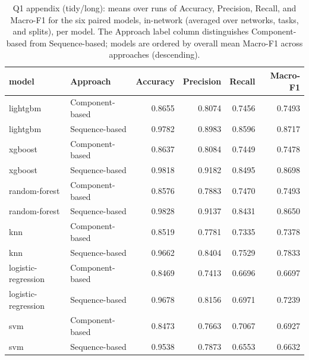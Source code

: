 \begin{table}
\caption{Q1 appendix (tidy/long): means over runs of Accuracy, Precision, Recall, and Macro-F1 for the six paired models, in-network (averaged over networks, tasks, and splits), per model. The Approach label column distinguishes Component-based from Sequence-based; models are ordered by overall mean Macro-F1 across approaches (descending).}
\label{tab:q1_appendix_per_model}
\begin{tabular}{llrrrr}
\toprule
model & Approach & Accuracy & Precision & Recall & Macro-F1 \\
\midrule
lightgbm & Component-based & 0.8655 & 0.8074 & 0.7456 & 0.7493 \\
lightgbm & Sequence-based & 0.9782 & 0.8983 & 0.8596 & 0.8717 \\
xgboost & Component-based & 0.8637 & 0.8084 & 0.7449 & 0.7478 \\
xgboost & Sequence-based & 0.9818 & 0.9182 & 0.8495 & 0.8698 \\
random-forest & Component-based & 0.8576 & 0.7883 & 0.7470 & 0.7493 \\
random-forest & Sequence-based & 0.9828 & 0.9137 & 0.8431 & 0.8650 \\
knn & Component-based & 0.8519 & 0.7781 & 0.7335 & 0.7378 \\
knn & Sequence-based & 0.9662 & 0.8404 & 0.7529 & 0.7833 \\
logistic-regression & Component-based & 0.8469 & 0.7413 & 0.6696 & 0.6697 \\
logistic-regression & Sequence-based & 0.9678 & 0.8156 & 0.6971 & 0.7239 \\
svm & Component-based & 0.8473 & 0.7663 & 0.7067 & 0.6927 \\
svm & Sequence-based & 0.9538 & 0.7873 & 0.6553 & 0.6632 \\
\bottomrule
\end{tabular}
\end{table}
